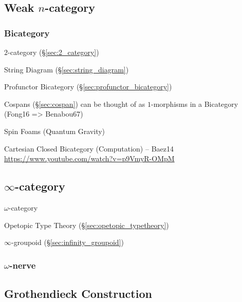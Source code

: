\subsection{Weak $n$-category}\label{sec:weak_ncategory}

\subsubsection{Bicategory}\label{sec:bicategory}

$2$-category (\S\ref{sec:2_category})

String Diagram (\S\ref{sec:string_diagram})

Profunctor Bicategory (\S\ref{sec:profunctor_bicategory})

Cospans (\S\ref{sec:cospan}) can be thought of as $1$-morphisms in a
Bicategory (Fong16 => Benabou67)

Spin Foams (Quantum Gravity)

Cartesian Closed Bicategory (Computation) -- Baez14
\url{https://www.youtube.com/watch?v=p9VmyR-OMpM}



\subsection{$\infty$-category}\label{sec:infinity_category}

$\omega$-category

Opetopic Type Theory (\S\ref{sec:opetopic_typetheory})

\fist $\infty$-groupoid (\S\ref{sec:infinity_groupoid})



\subsubsection{$\omega$-nerve}\label{sec:omega_nerve}



\subsection{Grothendieck Construction}
\label{sec:grothendieck_construction}

